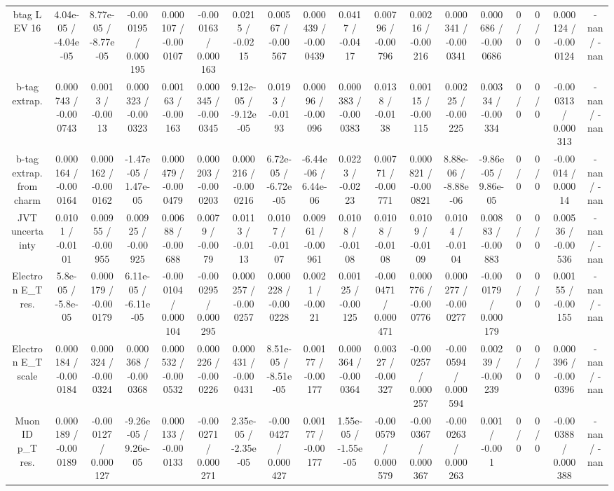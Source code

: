 \documentclass[10pt]{article}
\begin{document}
\begin{table}[htbp]
\begin{center}
\begin{tabular}{|c|c|c|c|c|c|c|c|c|c|c|c|c|c|c|c|c|c|}
  btag L EV 16 & 4.04e-05 / -4.04e-05 & 8.77e-05 / -8.77e-05 & -0.000195 / 0.000195 & 0.000107 / -0.000107 & -0.000163 / 0.000163 & 0.0215 / -0.0215 & 0.00567 / -0.00567 & 0.000439 / -0.000439 & 0.0417 / -0.0417 & 0.00796 / -0.00796 & 0.00216 / -0.00216 & 0.000341 / -0.000341 & 0.000686 / -0.000686 & 0 / 0 & 0 / 0 & 0.000124 / -0.000124 & -nan / -nan \\ 
  b-tag extrap. & 0.000743 / -0.000743 & 0.0013 / -0.0013 & 0.000323 / -0.000323 & 0.00163 / -0.00163 & 0.000345 / -0.000345 & 9.12e-05 / -9.12e-05 & 0.0193 / -0.0193 & 0.00096 / -0.00096 & 0.000383 / -0.000383 & 0.0138 / -0.0138 & 0.00115 / -0.00115 & 0.00225 / -0.00225 & 0.00334 / -0.00334 & 0 / 0 & 0 / 0 & -0.000313 / 0.000313 & -nan / -nan \\ 
  b-tag extrap. from charm & 0.000164 / -0.000164 & 0.000162 / -0.000162 & -1.47e-05 / 1.47e-05 & 0.000479 / -0.000479 & 0.000203 / -0.000203 & 0.000216 / -0.000216 & 6.72e-05 / -6.72e-05 & -6.44e-06 / 6.44e-06 & 0.0223 / -0.0223 & 0.00771 / -0.00771 & 0.000821 / -0.000821 & 8.88e-06 / -8.88e-06 & -9.86e-05 / 9.86e-05 & 0 / 0 & 0 / 0 & -0.00014 / 0.00014 & -nan / -nan \\ 
  JVT uncertainty & 0.0101 / -0.0101 & 0.00955 / -0.00955 & 0.00925 / -0.00925 & 0.00688 / -0.00688 & 0.0079 / -0.0079 & 0.0113 / -0.0113 & 0.0107 / -0.0107 & 0.00961 / -0.00961 & 0.0108 / -0.0108 & 0.0108 / -0.0108 & 0.0109 / -0.0109 & 0.0104 / -0.0104 & 0.00883 / -0.00883 & 0 / 0 & 0 / 0 & 0.00536 / -0.00536 & -nan / -nan \\ 
  Electron E_{T} res. & 5.8e-05 / -5.8e-05 & 0.000179 / -0.000179 & 6.11e-05 / -6.11e-05 & -0.000104 / 0.000104 & -0.000295 / 0.000295 & 0.000257 / -0.000257 & 0.000228 / -0.000228 & 0.0021 / -0.0021 & 0.00125 / -0.00125 & -0.000471 / 0.000471 & 0.000776 / -0.000776 & 0.000277 / -0.000277 & -0.000179 / 0.000179 & 0 / 0 & 0 / 0 & 0.00155 / -0.00155 & -nan / -nan \\ 
  Electron E_{T} scale & 0.000184 / -0.000184 & 0.000324 / -0.000324 & 0.000368 / -0.000368 & 0.000532 / -0.000532 & 0.000226 / -0.000226 & 0.000431 / -0.000431 & 8.51e-05 / -8.51e-05 & 0.00177 / -0.00177 & 0.000364 / -0.000364 & 0.00327 / -0.00327 & -0.000257 / 0.000257 & -0.000594 / 0.000594 & 0.00239 / -0.00239 & 0 / 0 & 0 / 0 & 0.000396 / -0.000396 & -nan / -nan \\ 
  Muon ID p_{T} res. & 0.000189 / -0.000189 & -0.000127 / 0.000127 & -9.26e-05 / 9.26e-05 & 0.000133 / -0.000133 & -0.000271 / 0.000271 & 2.35e-05 / -2.35e-05 & -0.000427 / 0.000427 & 0.00177 / -0.00177 & 1.55e-05 / -1.55e-05 & -0.000579 / 0.000579 & -0.000367 / 0.000367 & -0.000263 / 0.000263 & 0.001 / -0.001 & 0 / 0 & 0 / 0 & -0.000388 / 0.000388 & -nan / -nan \\ 

\end{tabular}
\end{center}
\end{table}
\end{document}

